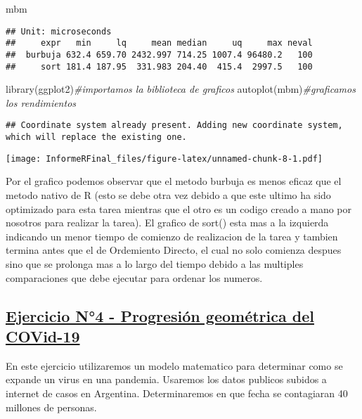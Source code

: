 \documentclass[preprint, 3p,
authoryear]{elsarticle} %
\newenvironment{Shaded}{\begin{snugshade}}{\end{snugshade}}
\newcommand{\CommentTok}[1]{\textcolor[rgb]{0.56,0.35,0.01}{\textit{#1}}}
\newcommand{\FunctionTok}[1]{\textcolor[rgb]{0.00,0.00,0.00}{#1}}
\newcommand{\NormalTok}[1]{#1}
\begin{document}
\begin{Shaded}
\begin{Highlighting}[]
\NormalTok{mbm}
\end{Highlighting}
\end{Shaded}

\begin{verbatim}
## Unit: microseconds
##     expr   min     lq     mean median     uq     max neval
##  burbuja 632.4 659.70 2432.997 714.25 1007.4 96480.2   100
##     sort 181.4 187.95  331.983 204.40  415.4  2997.5   100
\end{verbatim}

\begin{Shaded}
\begin{Highlighting}[]
\FunctionTok{library}\NormalTok{(ggplot2)}\CommentTok{\#importamos la biblioteca de graficos}
\FunctionTok{autoplot}\NormalTok{(mbm)}\CommentTok{\#graficamos los rendimientos}
\end{Highlighting}
\end{Shaded}

\begin{verbatim}
## Coordinate system already present. Adding new coordinate system, which will replace the existing one.
\end{verbatim}

\texttt{[image: InformeRFinal\_files/figure-latex/unnamed-chunk-8-1.pdf]}

Por el grafico podemos observar que el metodo burbuja es menos eficaz
que el metodo nativo de R (esto se debe otra vez debido a que este
ultimo ha sido optimizado para esta tarea mientras que el otro es un
codigo creado a mano por nosotros para realizar la tarea). El grafico de
sort() esta mas a la izquierda indicando un menor tiempo de comienzo de
realizacion de la tarea y tambien termina antes que el de Ordemiento
Directo, el cual no solo comienza despues sino que se prolonga mas a lo
largo del tiempo debido a las multiples comparaciones que debe ejecutar
para ordenar los numeros.

\hypertarget{ejercicio-n4---progresiuxf3n-geomuxe9trica-del-covid-19}{%
\subsection{\texorpdfstring{\uline{\textbf{Ejercicio N°4 - Progresión
geométrica del
COVid-19}}}{Ejercicio N°4 - Progresión geométrica del COVid-19}}\label{ejercicio-n4---progresiuxf3n-geomuxe9trica-del-covid-19}}

En este ejercicio utilizaremos un modelo matematico para determinar como
se expande un virus en una pandemia. Usaremos los datos publicos subidos
a internet de casos en Argentina. Determinaremos en que fecha se
contagiaran 40 millones de personas.
\end{document}
